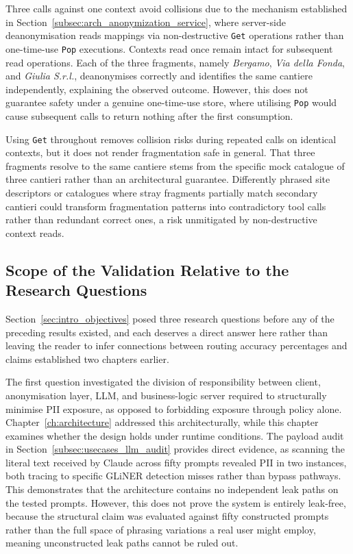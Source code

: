 Three calls against one context avoid collisions due to the mechanism established in Section~\ref{subsec:arch_anonymization_service}, where server-side deanonymisation reads mappings via non-destructive \texttt{Get} operations rather than one-time-use \texttt{Pop} executions. Contexts read once remain intact for subsequent read operations. Each of the three fragments, namely \emph{Bergamo}, \emph{Via della Fonda}, and \emph{Giulia S.r.l.}, deanonymises correctly and identifies the same cantiere independently, explaining the observed outcome. However, this does not guarantee safety under a genuine one-time-use store, where utilising \texttt{Pop} would cause subsequent calls to return nothing after the first consumption.

Using \texttt{Get} throughout removes collision risks during repeated calls on identical contexts, but it does not render fragmentation safe in general. That three fragments resolve to the same cantiere stems from the specific mock catalogue of three cantieri rather than an architectural guarantee. Differently phrased site descriptors or catalogues where stray fragments partially match secondary cantieri could transform fragmentation patterns into contradictory tool calls rather than redundant correct ones, a risk unmitigated by non-destructive context reads.

\subsection{Scope of the Validation Relative to the Research Questions}
\label{subsec:usecases_rq_mapping}

Section~\ref{sec:intro_objectives} posed three research questions before any of the preceding results existed, and each deserves a direct answer here rather than leaving the reader to infer connections between routing accuracy percentages and claims established two chapters earlier.

The first question investigated the division of responsibility between client, anonymisation layer, LLM, and business-logic server required to structurally minimise PII exposure, as opposed to forbidding exposure through policy alone. Chapter~\ref{ch:architecture} addressed this architecturally, while this chapter examines whether the design holds under runtime conditions. The payload audit in Section~\ref{subsec:usecases_llm_audit} provides direct evidence, as scanning the literal text received by Claude across fifty prompts revealed PII in two instances, both tracing to specific GLiNER detection misses rather than bypass pathways. This demonstrates that the architecture contains no independent leak paths on the tested prompts. However, this does not prove the system is entirely leak-free, because the structural claim was evaluated against fifty constructed prompts rather than the full space of phrasing variations a real user might employ, meaning unconstructed leak paths cannot be ruled out.

